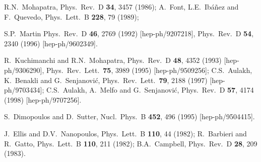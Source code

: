\documentclass[11pt]{article}
\begin{document}
\begin{thebibliography}{999}
R.N.~Mohapatra, 
  Phys.\ Rev.\ D {\bf 34}, 3457 (1986);
A.~Font, L.E.~Ib\'a\~nez and F.~Quevedo,
  Phys.\ Lett.\ B {\bf 228}, 79 (1989);

S.P.~Martin
  Phys.\ Rev.\ D {\bf 46}, 2769 (1992)
  [hep-ph/9207218],
  Phys.\ Rev.\ D {\bf 54}, 2340 (1996)
  [hep-ph/9602349].

R.~Kuchimanchi and R.N.~Mohapatra, 
  Phys.\ Rev.\ D {\bf 48}, 4352 (1993)
  [hep-ph/9306290],
  Phys.\ Rev.\ Lett.\  {\bf 75}, 3989 (1995)
  [hep-ph/9509256];
C.S.~Aulakh, K.~Benakli and G.~Senjanovi\'c, 
  Phys.\ Rev.\ Lett.\  {\bf 79}, 2188 (1997)
  [hep-ph/9703434];
C.S.~Aulakh, A.~Melfo and G.~Senjanovi\'c, 
  Phys.\ Rev.\ D {\bf 57}, 4174 (1998)
  [hep-ph/9707256].

 S.~Dimopoulos and D.~Sutter,
  Nucl.\ Phys.\ B {\bf 452}, 496 (1995)
  [hep-ph/9504415].

J.~Ellis and D.V.~Nanopoulos,
  Phys.\ Lett.\ B {\bf 110}, 44 (1982);
R.~Barbieri and R.~Gatto,
  Phys.\ Lett.\ B {\bf 110}, 211 (1982);
B.A.~Campbell, 
  Phys.\ Rev.\ D {\bf 28}, 209 (1983).


\end{thebibliography}
\end{document}

